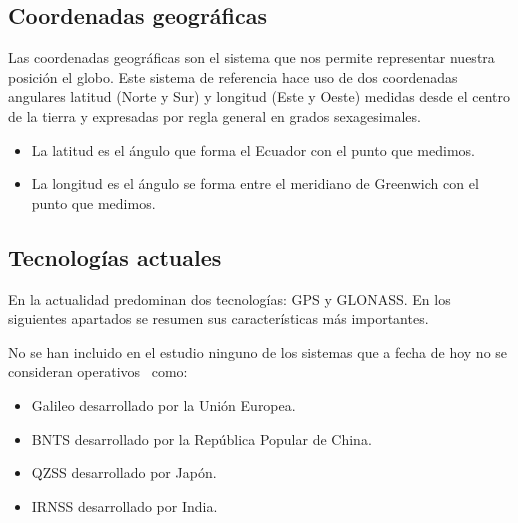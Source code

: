 \subsection{Coordenadas geográficas}

Las coordenadas geográficas son el sistema que nos permite representar nuestra posición el
globo. Este sistema de referencia hace uso de dos coordenadas angulares latitud (Norte y Sur) y
longitud (Este y Oeste) medidas desde el centro de la tierra y expresadas por regla general en
grados sexagesimales.

\begin{itemize}
  \item La latitud es el ángulo que forma el Ecuador con el punto que medimos.
  \item La longitud es el ángulo se forma entre el meridiano de Greenwich con el punto que medimos.
\end{itemize}

\subsection{Tecnologías actuales}

En la actualidad predominan dos tecnologías: \acf{GPS} y \acf{GLONASS}. En los siguientes apartados
se resumen sus características más importantes.

No se han incluido en el estudio ninguno de los sistemas que a fecha de hoy no se consideran
operativos~\cite{SPSA} como:

\begin{itemize}
  \item Galileo desarrollado por la Unión Europea.
  \item \acf{BNTS} desarrollado por la República Popular de China.
  \item \acf{QZSS} desarrollado por Japón.
  \item \acf{IRNSS} desarrollado por India.
\end{itemize}

